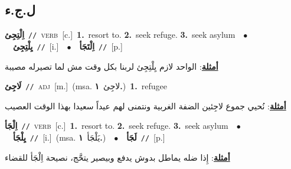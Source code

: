\documentclass[10pt,a4paper,twoside]{article} %
\begin{document}
\begin{multicols}{2}
{{{{{{{{{{{{{{{{\vspace{-3mm}
\subsection*{\color{blue}\foreignlanguage{arabic}{ل.ج.ء}\color{blue}{}} 

{\setlength\topsep{0pt}\textbf{\foreignlanguage{arabic}{اِلْتِجِئ}}\ {\color{gray}\texttt{//}\color{black}}\ \textsc{verb}\ [c.]\ \textbf{1.}~resort to.  \textbf{2.}~seek refuge.  \textbf{3.}~seek asylum\ \ $\bullet$\ \ \setlength\topsep{0pt}\textbf{\foreignlanguage{arabic}{يِلْتِجِئ}}\ {\color{gray}\texttt{//}\color{black}}\ [i.]\ \ $\bullet$\ \ \setlength\topsep{0pt}\textbf{\foreignlanguage{arabic}{اِلْتَجَأ}}\ {\color{gray}\texttt{//}\color{black}}\ [p.]\  \begin{flushright}\color{gray}\foreignlanguage{arabic}{\textbf{\underline{\foreignlanguage{arabic}{أمثلة}}}: الواحد لازم يِلْتِجِئ لربنا بكل وقت مش لما تصيرله مصيبة}\end{flushright}\color{black}} \vspace{2mm}

{\setlength\topsep{0pt}\textbf{\foreignlanguage{arabic}{لَاجِئ}}\ {\color{gray}\texttt{//}\color{black}}\ \textsc{adj}\ [m.]\ \color{gray}(msa. \foreignlanguage{arabic}{لاجِئ}~\foreignlanguage{arabic}{\textbf{١.}})\color{black}\ \textbf{1.}~refugee\  \begin{flushright}\color{gray}\foreignlanguage{arabic}{\textbf{\underline{\foreignlanguage{arabic}{أمثلة}}}: نُحيي جموع لاجِئين الضفة الغربية ونتمنى لهم عيداً سعيدا بهذا الوقت العصيب}\end{flushright}\color{black}} \vspace{2mm}

{\setlength\topsep{0pt}\textbf{\foreignlanguage{arabic}{اِلْجَأ}}\ {\color{gray}\texttt{//}\color{black}}\ \textsc{verb}\ [c.]\ \textbf{1.}~resort to.  \textbf{2.}~seek refuge.  \textbf{3.}~seek asylum\ \ $\bullet$\ \ \setlength\topsep{0pt}\textbf{\foreignlanguage{arabic}{يِلْجَأ}}\ {\color{gray}\texttt{//}\color{black}}\ [i.]\ \color{gray}(msa. \foreignlanguage{arabic}{يَلْجَأ}~\foreignlanguage{arabic}{\textbf{١.}})\color{black}\ \ $\bullet$\ \ \setlength\topsep{0pt}\textbf{\foreignlanguage{arabic}{لَجَأ}}\ {\color{gray}\texttt{//}\color{black}}\ [p.]\  \begin{flushright}\color{gray}\foreignlanguage{arabic}{\textbf{\underline{\foreignlanguage{arabic}{أمثلة}}}: إِذا ضله يماطل بدوش يدفع وبيصير يتحَّج، نصيحة اِلْجَأ للقضاء}\end{flushright}\color{black}} \vspace{2mm}

}}}}}}}}}}}}}}}}
\end{multicols}
\end{document}
